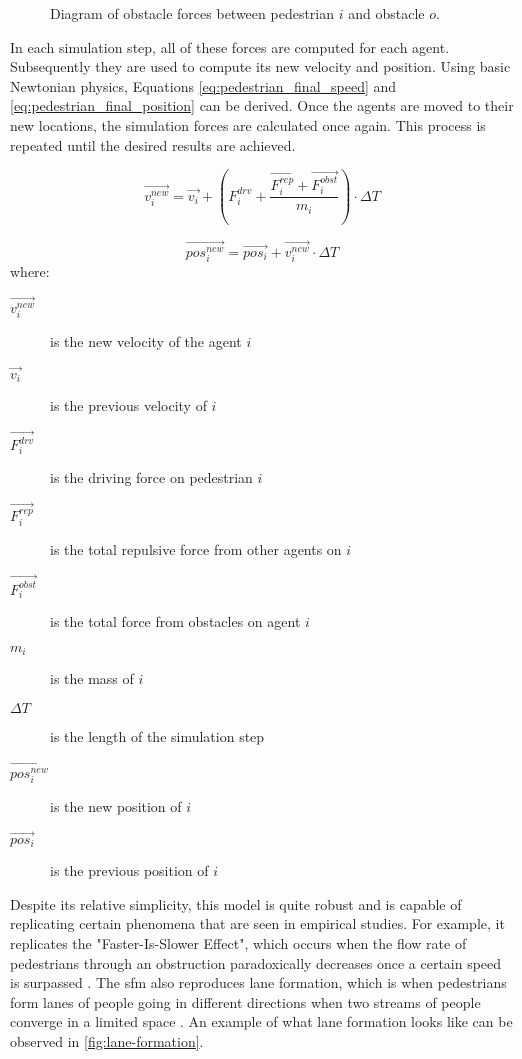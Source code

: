 \documentclass[twoside, 11pt]{article}
\begin{document}
\begin{figure}[h]
  \centering
  
  \caption[Diagram of obstacle forces between pedestrian $i$ and obstacle $o$]{Diagram of obstacle forces between pedestrian $i$ and obstacle $o$.}
  \label{fig:obstacle-forces}
\end{figure}

In each simulation step, all of these forces are computed for each agent. Subsequently they are used to compute its new velocity and position. Using basic Newtonian physics, Equations \eqref{eq:pedestrian_final_speed} and \eqref{eq:pedestrian_final_position} can be derived. Once the agents are moved to their new locations, the simulation forces are calculated once again. This process is repeated until the desired results are achieved.

\begin{equation}
  \vec{v_i^{new}} = \vec{v_i} + ( F_i^{drv} + \frac{\vec{F_i^{rep}} + \vec{F_i^{obst}}}{m_i} ) \cdot \Delta T
  \label{eq:pedestrian_final_speed}
\end{equation}

\begin{equation}
  \vec{pos_i^{new}} = \vec{pos_i} + \vec{v_i^{new}} \cdot \Delta T
  \label{eq:pedestrian_final_position}
\end{equation}
where:
\begin{description}
  \item[$\vec{v_i^{new}}$] is the new velocity of the agent $i$
  \item[$\vec{v_i}$] is the previous velocity of $i$
  \item[$\vec{F_i^{drv}}$] is the driving force on pedestrian $i$
  \item[$\vec{F_i^{rep}}$] is the total repulsive force from other agents on $i$
  \item[$\vec{F_i^{obst}}$] is the total force from obstacles on agent $i$
  \item[$m_i$] is the mass of $i$ 
  \item[$\Delta T$] is the length of the simulation step
  \item[$\vec{pos_i^{new}}$] is the new position of $i$
  \item[$\vec{pos_i}$] is the previous position of $i$
\end{description}

Despite its relative simplicity, this model is quite robust and is capable of replicating certain phenomena that are seen in empirical studies. For example, it replicates the "Faster-Is-Slower Effect", which occurs when the flow rate of pedestrians through an obstruction paradoxically decreases once a certain speed is surpassed \cite{helbingSimulatingDynamicFeatures2000}. The \gls{sfm} also reproduces lane formation, which is when pedestrians form lanes of people going in different directions when two streams of people converge in a limited space \cite{PhysRevE.94.032304}. An example of what lane formation looks like can be observed in \autoref{fig:lane-formation}.
\end{document}
